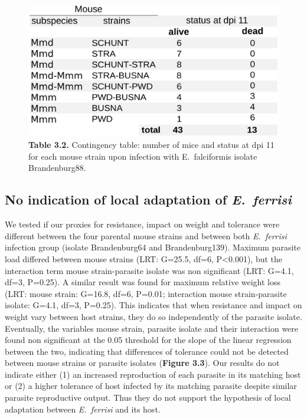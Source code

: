 \begin{figure}[H]
	\centering
	\includegraphics[width=\linewidth,height=\textheight,keepaspectratio]{images/3article2/Table2_final.pdf}
	\captionsetup{labelformat=empty}
	\caption{\textbf{Table 3.2.} Contingency table: number of mice and status at dpi 11 for each mouse strain upon infection with E. falciformis isolate Brandenburg88.}
\end{figure}
\addtocounter{figure}{-1}

\subsection{No indication of local adaptation of \textit{E.~ferrisi}}

We tested if our proxies for resistance, impact on weight and tolerance were different between the four parental mouse strains and between both \textit{E.~ferrisi} infection group (isolate Brandenburg64 and Brandenburg139). Maximum parasite load differed between mouse strains (LRT: G=25.5, df=6, P<0.001), but the interaction term mouse strain-parasite isolate was non significant (LRT: G=4.1, df=3, P=0.25). A similar result was found for maximum relative weight loss (LRT: mouse strain: G=16.8, df=6, P=0.01; interaction mouse strain-parasite isolate: G=4.1, df=3, P=0.25). This indicates that when resistance and impact on weight vary between host strains, they do so independently of the parasite isolate. Eventually, the variables mouse strain, parasite isolate and their interaction were found non significant at the 0.05 threshold for the slope of the linear regression between the two, indicating that differences of tolerance could not be detected between mouse strains or parasite isolates (\textbf{Figure 3.3}). Our results do not indicate either (1) an increased reproduction of each parasite in its matching host or (2) a higher tolerance of host infected by its matching parasite despite similar parasite reproductive output. Thus they do not support the hypothesis of local adaptation between \textit{E.~ferrisi} and its host.

